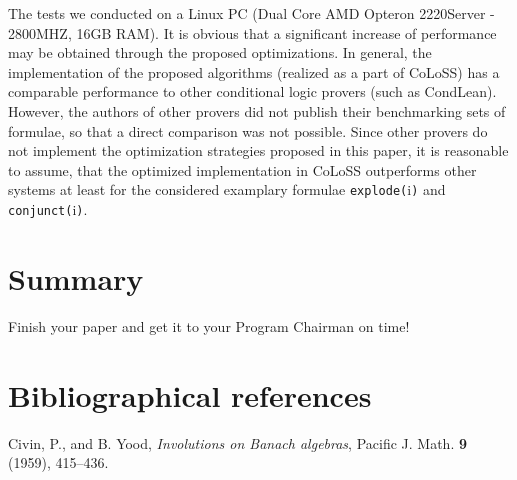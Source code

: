 \documentclass{entcs} \usepackage{entcsmacro}
\begin{document}
The tests we conducted on a Linux PC (Dual Core AMD Opteron 2220Server - 2800MHZ, 16GB RAM).
It is obvious that a significant increase of performance may be obtained through
the proposed optimizations. In general, the implementation of the proposed algorithms (realized
as a part of CoLoSS) has a comparable performance to
other conditional logic provers (such as CondLean). However, the authors of other
provers did not publish their benchmarking sets of formulae, so that a direct
comparison was not possible. Since other provers do not implement the optimization
strategies proposed in this paper, it is reasonable to assume, that the optimized
implementation in CoLoSS outperforms other systems at least for the 
considered examplary formulae \verb|explode(|i\verb|)| and \verb|conjunct(|i\verb|)|.

\section{Summary}  
\begin{problem}
  Finish your paper and get it to your Program Chairman on time!
\end{problem}

\section{Bibliographical references}\label{references}

\begin{thebibliography}{10}\label{bibliography}
 Civin, P., and B. Yood, \emph{Involutions on Banach
    algebras}, Pacific J. Math. \textbf{9} (1959), 415--436.
  
\end{thebibliography}
\end{document}
